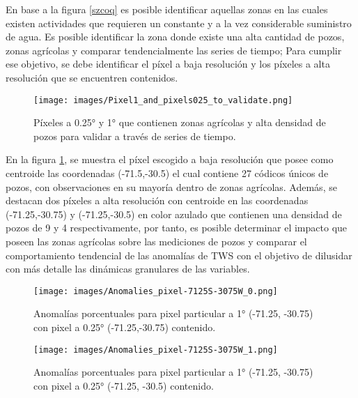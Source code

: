 En base a la figura \ref{szcoq} es posible identificar aquellas zonas en las cuales existen actividades que requieren un constante y a la vez considerable suministro de agua. Es posible identificar la zona donde existe una alta cantidad de pozos, zonas agrícolas y comparar
tendencialmente las series de tiempo; Para cumplir ese objetivo, se debe identificar el píxel a baja resolución y los píxeles a alta resolución que se encuentren contenidos.

\begin{figure}[H]
    \centering
          \texttt{[image: images/Pixel1\_and\_pixels025\_to\_validate.png]}
          \vskip -0.1in
    \caption[Píxeles a 0.25° y 1° que contienen zonas agrícolas y alta densidad de pozos]{\footnotesize Píxeles a 0.25° y 1° que contienen zonas agrícolas y alta densidad de pozos para validar a través de series de tiempo.}
    \label{pixelscoq}
\end{figure}
En la figura \ref{pixelscoq}, se muestra el píxel escogido a baja resolución que posee como centroide las coordenadas (-71.5,-30.5) el cual contiene 27 códicos únicos de pozos, con observaciones en su mayoría dentro de zonas agrícolas. Además, se destacan dos píxeles a alta resolución con centroide en las coordenadas 
(-71.25,-30.75) y (-71.25,-30.5) en color azulado que contienen una densidad de pozos de 9 y 4 respectivamente, por tanto, es posible determinar el impacto
que poseen las zonas agrícolas sobre las mediciones de pozos y comparar el comportamiento tendencial de las anomalías de TWS con el objetivo de dilusidar con más detalle las dinámicas granulares de las variables.


\begin{figure}[H]
    \centering
          \texttt{[image: images/Anomalies\_pixel-7125S-3075W\_0.png]}
          \vskip -0.1in
    \caption[Series de tiempo para pixel particular a 1° con pixel a 0.25° contenido]{\footnotesize Anomalías porcentuales para pixel particular a 1° (-71.25, -30.75) con pixel a 0.25° (-71.25,-30.75) contenido.}
    \label{tspixel0}
\end{figure}

\begin{figure}[H]
    \centering
          \texttt{[image: images/Anomalies\_pixel-7125S-3075W\_1.png]}
          \vskip -0.1in
    \caption[Series de tiempo para pixel particular a 1° con pixel a 0.25° contenido]{\footnotesize Anomalías porcentuales para pixel particular a 1° (-71.25, -30.75) con pixel a 0.25° (-71.25, -30.5) contenido.}
    \label{tspixel1}
\end{figure}

